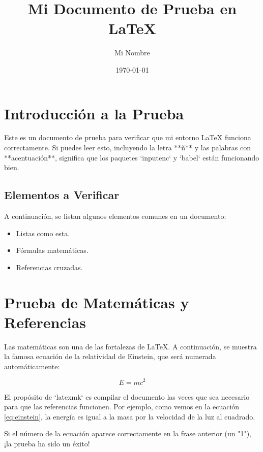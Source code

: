 \documentclass[12pt, letterpaper]{article}
\title{Mi Documento de Prueba en \LaTeX}
\author{Mi Nombre}
\date{\today} %
\begin{document}
\maketitle

\section{Introducción a la Prueba}

Este es un documento de prueba para verificar que mi entorno \LaTeX{} funciona correctamente. Si puedes leer esto, incluyendo la letra **ñ** y las palabras con **acentuación**, significa que los paquetes `inputenc` y `babel` están funcionando bien.

\subsection{Elementos a Verificar}

A continuación, se listan algunos elementos comunes en un documento:
\begin{itemize}
    \item Listas como esta.
    \item Fórmulas matemáticas.
    \item Referencias cruzadas.
\end{itemize}

\section{Prueba de Matemáticas y Referencias}

Las matemáticas son una de las fortalezas de \LaTeX. A continuación, se muestra la famosa ecuación de la relatividad de Einstein, que será numerada automáticamente:

\begin{equation}
E = mc^2
\label{eq:einstein}
\end{equation}

El propósito de `latexmk` es compilar el documento las veces que sea necesario para que las referencias funcionen. Por ejemplo, como vemos en la ecuación \ref{eq:einstein}, la energía es igual a la masa por la velocidad de la luz al cuadrado.

Si el número de la ecuación aparece correctamente en la frase anterior (un "1"), ¡la prueba ha sido un éxito!
\end{document}
